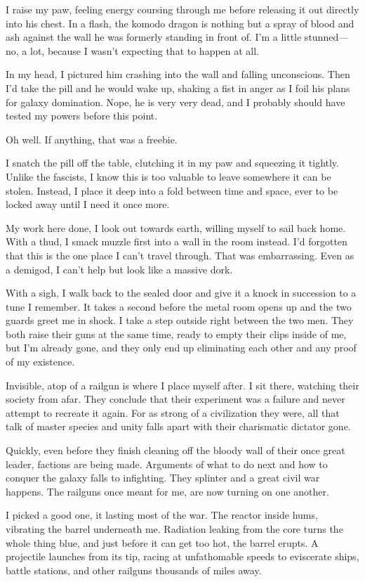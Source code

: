 I raise my paw, feeling energy coursing through me before releasing it out directly into his chest. In a flash, the komodo dragon is nothing but a spray of blood and ash against the wall he was formerly standing in front of. I'm a little stunned--- no, a lot, because I wasn't expecting that to happen at all.

In my head, I pictured him crashing into the wall and falling unconscious. Then I'd take the pill and he would wake up, shaking a fist in anger as I foil his plans for galaxy domination. Nope, he is very very dead, and I probably should have tested my powers before this point.

Oh well. If anything, that was a freebie.

I snatch the pill off the table, clutching it in my paw and squeezing it tightly. Unlike the fascists, I know this is too valuable to leave somewhere it can be stolen. Instead, I place it deep into a fold between time and space, ever to be locked away until I need it once more.

My work here done, I look out towards earth, willing myself to sail back home. With a thud, I smack muzzle first into a wall in the room instead. I'd forgotten that this is the one place I can't travel through. That was embarrassing. Even as a demigod, I can't help but look like a massive dork.

With a sigh, I walk back to the sealed door and give it a knock in succession to a tune I remember. It takes a second before the metal room opens up and the two guards greet me in shock. I take a step outside right between the two men. They both raise their guns at the same time, ready to empty their clips inside of me, but I'm already gone, and they only end up eliminating each other and any proof of my existence.

Invisible, atop of a railgun is where I place myself after. I sit there, watching their society from afar. They conclude that their experiment was a failure and never attempt to recreate it again. For as strong of a civilization they were, all that talk of master species and unity falls apart with their charismatic dictator gone.

Quickly, even before they finish cleaning off the bloody wall of their once great leader, factions are being made. Arguments of what to do next and how to conquer the galaxy falls to infighting. They splinter and a great civil war happens. The railguns once meant for me, are now turning on one another.

I picked a good one, it lasting most of the war. The reactor inside hums, vibrating the barrel underneath me. Radiation leaking from the core turns the whole thing blue, and just before it can get too hot, the barrel erupts. A projectile launches from its tip, racing at unfathomable speeds to eviscerate ships, battle stations, and other railguns thousands of miles away.

